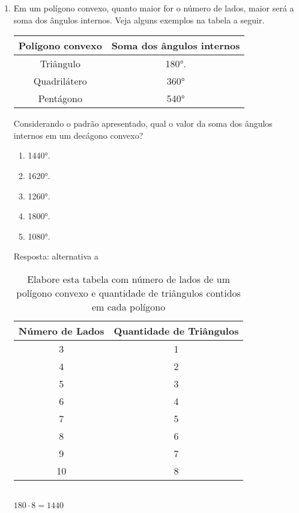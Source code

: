 \documentclass[a4paper,14pt]{article}
\begin{document}
\begin{enumerate}
	    \item Em um polígono convexo, quanto maior for o número de lados, maior será a soma dos ângulos internos.
	    \newline Veja alguns exemplos na tabela a seguir.
	    \newline
	    \newline
	    \begin{tabular}{|c|c|} %
	    	\hline %
	    	Polígono convexo & Soma dos ângulos internos \\ %
	    	\hline %
	    	Triângulo & 180°. \\ %
	    	\hline %
	    	Quadrilátero & 360° \\ %
	    	\hline %
	    	Pentágono & 540° \\ %
	    	\hline %
	    \end{tabular}
        \newline
        \newline
        Considerando o padrão apresentado, qual o valor da soma dos ângulos internos em um decágono
        convexo?
        \begin{enumerate}
        	\item 1440°.
        	\item 1620°.
        	\item 1260°.
        	\item 1800°.
        	\item 1080°.
        \end{enumerate}
        Resposta: alternativa a
        \newline
        \begin{table}[h]
        	\centering
        	\caption{Elabore esta tabela com número de lados de um polígono convexo e quantidade de triângulos contidos em cada polígono}
        	\label{tab:poligonos}
        	\begin{tabular}{cc}
        		\toprule
        		\textbf{Número de Lados} & \textbf{Quantidade de Triângulos} \\
        		\midrule
        		3  & 1 \\
        		4  & 2 \\
        		5  & 3 \\
        		6  & 4 \\
        		7  & 5 \\
        		8  & 6 \\
        		9  & 7 \\
        		10 & 8 \\
        		\bottomrule
        	\end{tabular}
        \end{table}
        \\
        $180 \cdot 8 = 1440$ 
        \vspace{1cm}
        

\end{enumerate}
\end{document}
